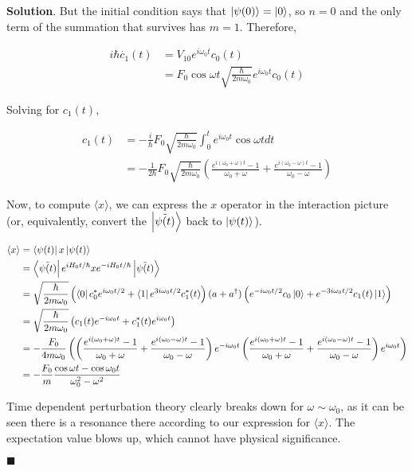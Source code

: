 \documentclass[12pt]{article}
\theoremstyle{definition}
\newenvironment{s}{%
        \begin{trivlist} \item \textbf{Solution}. }{%
            \hspace*{\fill} $\blacksquare$\end{trivlist}}%
\begin{document}
{\begin{s}
But the initial condition says that $\ket{\psi(0)} = \ket{0}$, so $n=0$ and the only term of the summation that survives has $m=1$. Therefore,

\begin{align*}
i\hbar\dot{c_{1}}(t) &= V_{10}e^{i\omega_{0}t}c_{0}(t)\\
&= F_{0}\cos\omega t\sqrt{\frac{\hbar}{2m\omega_{0}}}e^{i\omega_{0}t}c_{0}(t)
\end{align*}

Solving for $c_{1}(t)$, 

\begin{align*}
c_{1}(t) &= -\frac{i}{\hbar}F_{0}\sqrt{\frac{\hbar}{2m\omega_{0}}}\int_{0}^{t}e^{i\omega_{0}t}\cos\omega t dt\\
&= -\frac{1}{2\hbar}F_{0}\sqrt{\frac{\hbar}{2m\omega_{0}}}\left(\frac{e^{i(\omega_{0}+\omega)t}-1}{\omega_{0}+\omega}+\frac{e^{i(\omega_{0}-\omega)t}-1}{\omega_{0}-\omega}\right)
\end{align*}

Now, to compute $\langle x \rangle$, we can express the $x$ operator in the interaction picture (or, equivalently, convert the $\ket{\tilde{\psi(t)}}$ back to $\ket{\psi(t)}$).

\begin{align*}
\langle x \rangle &= \bra{\psi(t)} x \ket{\psi(t)} \\
&= \bra{\tilde{\psi(t)}}e^{iH_{0}t/\hbar} x e^{-iH_{0}t/\hbar}\ket{\tilde{\psi(t)}}\\
&= \sqrt{\frac{\hbar}{2m\omega_{0}}}\left(\bra{0}c_{0}^{*}e^{i\omega_{0}t/2} + \bra{1}e^{3i\omega_{0}t/2}c_{1}^{*}(t)\right)(a+a^{\dagger})\left(e^{-i\omega_{0}t/2}c_{0}\ket{0} + e^{-3i\omega_{0}t/2}c_{1}(t)\ket{1}\right)\\
&= \sqrt{\frac{\hbar}{2m\omega_{0}}}\left(c_{1}(t)e^{-i\omega_{0}t} + c_{1}^{*}(t)e^{i\omega_{0}t}\right)\\
&= -\frac{F_{0}}{4m\omega_{0}}\left(\left(\frac{e^{i(\omega_{0}+\omega)t}-1}{\omega_{0}+\omega}+\frac{e^{i(\omega_{0}-\omega)t}-1}{\omega_{0}-\omega}\right)e^{-i\omega_{0}t}  \left(\frac{e^{i(\omega_{0}+\omega)t}-1}{\omega_{0}+\omega}+\frac{e^{i(\omega_{0}-\omega)t}-1}{\omega_{0}-\omega}\right)e^{i\omega_{0}t}\right)\\
&= -\frac{F_{0}}{m}\frac{\cos\omega t - \cos\omega_{0}t}{\omega_{0}^{2}-\omega^{2}}
\end{align*}

Time dependent perturbation theory clearly breaks down for $\omega \sim \omega_{0}$, as it can be seen there is a resonance there according to our expression for $\langle x\rangle$. The expectation value blows up, which cannot have physical significance.


\end{s}}
\end{document}
